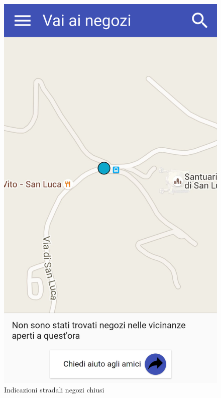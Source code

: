 \begin{figure}[H]
	\begin{minipage}{.49\textwidth}
		\includegraphics[width=\textwidth]{img/wireframe/mappa_negozi_chiusi.png}
		\caption{Indicazioni stradali negozi chiusi}
	\end{minipage}
	\hfill
	\begin{minipage}{.49\textwidth}

\end{minipage}
\end{figure}
